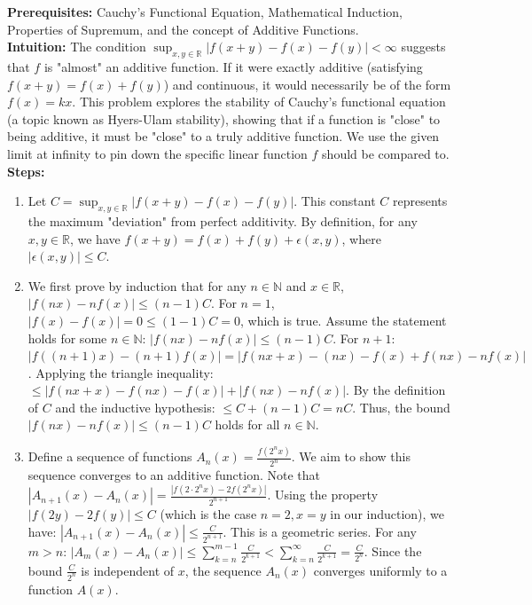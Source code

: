 \begin{solution}
\textbf{Prerequisites:} Cauchy's Functional Equation, Mathematical Induction, Properties of Supremum, and the concept of Additive Functions. \\[1em]
\textbf{Intuition:} The condition $\sup_{x,y\in\mathbb{R}}|f(x+y)-f(x)-f(y)| < \infty$ suggests that $f$ is "almost" an additive function. If it were exactly additive (satisfying $f(x+y)=f(x)+f(y)$) and continuous, it would necessarily be of the form $f(x)=kx$. This problem explores the stability of Cauchy's functional equation (a topic known as Hyers-Ulam stability), showing that if a function is "close" to being additive, it must be "close" to a truly additive function. We use the given limit at infinity to pin down the specific linear function $f$ should be compared to. \\[1em]
\textbf{Steps:}
\begin{enumerate}
    \item Let $C = \sup_{x,y\in\mathbb{R}}|f(x+y)-f(x)-f(y)|$. This constant $C$ represents the maximum "deviation" from perfect additivity. By definition, for any $x, y \in \mathbb{R}$, we have $f(x+y) = f(x) + f(y) + \epsilon(x,y)$, where $|\epsilon(x,y)| \leq C$.

    \item We first prove by induction that for any $n \in \mathbb{N}$ and $x \in \mathbb{R}$, $|f(nx) - nf(x)| \leq (n-1)C$.
    For $n=1$, $|f(x) - f(x)| = 0 \leq (1-1)C = 0$, which is true.
    Assume the statement holds for some $n \in \mathbb{N}$: $|f(nx) - nf(x)| \leq (n-1)C$.
    For $n+1$:
    $|f((n+1)x) - (n+1)f(x)| = |f(nx+x) - (nx) - f(x) + f(nx) - nf(x)|$.
    Applying the triangle inequality:
    $\leq |f(nx+x) - f(nx) - f(x)| + |f(nx) - nf(x)|$.
    By the definition of $C$ and the inductive hypothesis:
    $\leq C + (n-1)C = nC$.
    Thus, the bound $|f(nx) - nf(x)| \leq (n-1)C$ holds for all $n \in \mathbb{N}$.

    \item Define a sequence of functions $A_n(x) = \frac{f(2^n x)}{2^n}$. We aim to show this sequence converges to an additive function.
    Note that $|A_{n+1}(x) - A_n(x)| = \frac{|f(2 \cdot 2^n x) - 2f(2^n x)|}{2^{n+1}}$.
    Using the property $|f(2y) - 2f(y)| \leq C$ (which is the case $n=2, x=y$ in our induction), we have:
    $|A_{n+1}(x) - A_n(x)| \leq \frac{C}{2^{n+1}}$.
    This is a geometric series. For any $m > n$:
    $|A_m(x) - A_n(x)| \leq \sum_{k=n}^{m-1} \frac{C}{2^{k+1}} < \sum_{k=n}^{\infty} \frac{C}{2^{k+1}} = \frac{C}{2^n}$.
    Since the bound $\frac{C}{2^n}$ is independent of $x$, the sequence $A_n(x)$ converges uniformly to a function $A(x)$.


\end{enumerate}
\end{solution}

